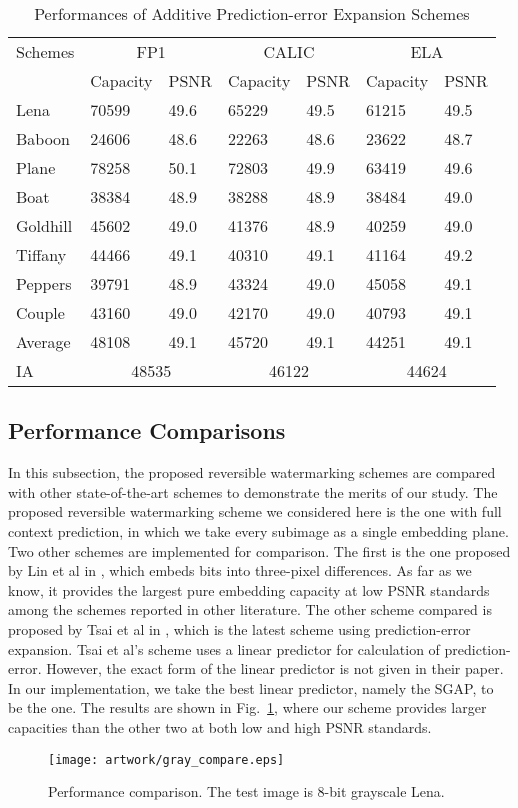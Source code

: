 \documentclass[journal]{IEEEtran}
\begin{document}
\begin{table}[t]
    \centering
    \caption{\label{tbl:iaresults}Performances of Additive Prediction-error Expansion Schemes}
    \begin{tabular}{lllllll}\hline\hline
      Schemes & \multicolumn{2}{c}{FP1} & \multicolumn{2}{c}{CALIC} & \multicolumn{2}{c}{ELA} \\
	 & Capacity & PSNR & Capacity & PSNR & Capacity & PSNR \\\hline
	Lena	& 70599 & 49.6 & 65229 & 49.5 & 61215 & 49.5 \\
	Baboon	& 24606 & 48.6 & 22263 & 48.6 & 23622 & 48.7 \\
	Plane	& 78258 & 50.1 & 72803 & 49.9 & 63419 & 49.6 \\
	Boat	& 38384 & 48.9 & 38288 & 48.9 & 38484 & 49.0 \\
	Goldhill& 45602 & 49.0 & 41376 & 48.9 & 40259 & 49.0 \\
	Tiffany	& 44466 & 49.1 & 40310 & 49.1 & 41164 & 49.2 \\
	Peppers	& 39791 & 48.9 & 43324 & 49.0 & 45058 & 49.1 \\
	Couple	& 43160 & 49.0 & 42170 & 49.0 & 40793 & 49.1 \\
	Average	& 48108 & 49.1 & 45720 & 49.1 & 44251 & 49.1 \\
	IA & \multicolumn{2}{c}{48535} & \multicolumn{2}{c}{46122} & \multicolumn{2}{c}{44624} \\\hline\hline
    \end{tabular}
\end{table}
\subsection{Performance Comparisons}\label{sub:compare}
In this subsection, the proposed reversible watermarking schemes are compared with other
state-of-the-art schemes to demonstrate the merits of our study. The proposed reversible
watermarking scheme we considered here is the one with full context prediction, in which we take
every subimage as a single embedding plane. Two other schemes are implemented for comparison.
The first is the one proposed by Lin et al in \cite{Lin08tp}, which embeds bits into three-pixel
differences. As far as we know, it provides the largest pure embedding capacity at low PSNR
standards among the schemes reported in other literature. The other scheme compared is proposed by
Tsai et al in \cite{Tsai09pe}, which is the latest scheme using prediction-error expansion. Tsai et
al's scheme uses a linear predictor for calculation of prediction-error. However, the exact form of
the linear predictor is not given in their paper. In our implementation, we take the best linear
predictor, namely the SGAP, to be the one. The results are shown in Fig.\ \ref{fig:comlen}, where
our scheme provides larger capacities than the other two at both low and high PSNR standards. 
\begin{figure}[t]
    \centering
    \texttt{[image: artwork/gray\_compare.eps]}
    \caption{\label{fig:comlen}Performance comparison. The test image is 8-bit grayscale Lena. }
\end{figure}
\end{document}
